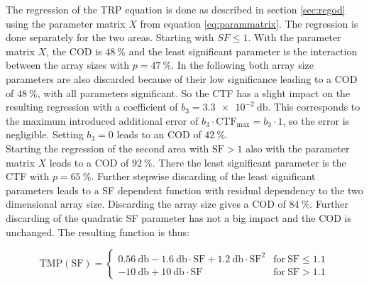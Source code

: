 The regression of the \ac{TRP} equation is done as described in section \ref{sec:regod} using the parameter matrix $X$ from equation \ref{eq:parammatrix}. The regression is done separately for the two areas. Starting with $SF\le 1$. With the parameter matrix $X$, the \ac{COD} is $\SI{48}{\percent}$ and the least significant parameter is the interaction between the array sizes with $p = \SI{47}{\percent}$. In the following both array size parameters are also discarded because of their low significance leading to a \ac{COD} of $\SI{48}{\percent}$, with all parameters significant. So the \ac{CTF} has a slight impact on the resulting regression with a coefficient of $b_3=\SI{3.3e-2}{\decibel}$. This corresponds to the maximum introduced additional error of $b_3\cdot\text{CTF}_\text{max}=b_3\cdot 1$, so the error is negligible. Setting $b_3 = 0$ leads to an \ac{COD} of $\SI{42}{\percent}$.\\
Starting the regression of the second area with $\text{SF} > 1$ also with the parameter matrix $X$ leads to a \ac{COD} of $\SI{92}{\percent}$. There the least significant parameter is the \ac{CTF} with $p = \SI{65}{\percent}$. Further stepwise discarding of the least significant parameters leads to a \ac{SF} dependent function with residual dependency to the two dimensional array size. Discarding the array size gives a \ac{COD} of $\SI{84}{\percent}$. Further discarding of the quadratic \ac{SF} parameter has not a big impact and the \ac{COD} is unchanged. The resulting function is thus:

\begin{equation}
\text{TMP}\left(\text{SF}\right)=\begin{cases} 
\SI{0.56}{\decibel}-\SI{1.6}{\decibel}\cdot \text{SF}+\SI{1.2}{\decibel}\cdot\text{SF}^2 & \text{for}\ \text{SF}\le 1.1\\
\SI{-10}{\decibel}+\SI{10}{\decibel}\cdot\text{SF} & \text{for}\ \text{SF}>1.1\end{cases}
\end{equation}

